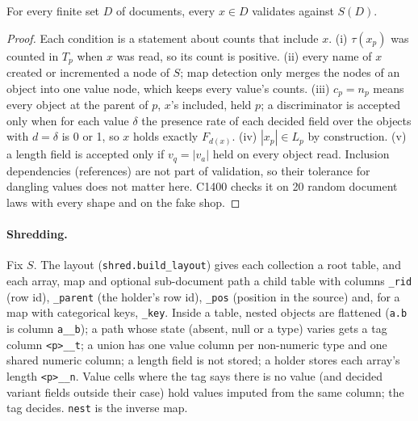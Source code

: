 \begin{proposition}\label{prop:docschema}
For every finite set $D$ of documents, every $x\in D$ validates against $S(D)$.
\end{proposition}
\begin{proof}
Each condition is a statement about counts that include $x$. (i) $\tau(x_p)$ was counted in $T_p$ when $x$ was read,
so its count is positive. (ii) every name of $x$ created or incremented a node of $S$; map detection only merges the
nodes of an object into one value node, which keeps every value's counts. (iii) $c_p=n_p$ means every object at
the parent of $p$, $x$'s included, held $p$; a discriminator is accepted only when for each value $\delta$ the
presence rate of each decided field over the objects with $d=\delta$ is 0 or 1, so $x$ holds exactly $F_{d(x)}$.
(iv) $|x_p|\in L_p$ by construction. (v) a length field is accepted only if $v_q=|v_a|$ held on every object read.
Inclusion dependencies (references) are not part of validation, so their tolerance for dangling values does not
matter here. C1400 checks it on 20 random document laws with every shape and on the fake shop.
\end{proof}

\paragraph{Shredding.} Fix $S$. The layout (\texttt{shred.build\_layout}) gives each collection a root table, and
each array, map and optional sub-document path a child table with columns \texttt{\_rid} (row id),
\texttt{\_parent} (the holder's row id), \texttt{\_pos} (position in the source) and, for a map with categorical
keys, \texttt{\_key}. Inside a table, nested objects are flattened (\texttt{a.b} is column \texttt{a\_\_b}); a path
whose state (absent, null or a type) varies gets a tag column \texttt{<p>\_\_t}; a union has one value column per
non-numeric type and one shared numeric column; a length field is not stored; a holder stores each array's length
\texttt{<p>\_\_n}. Value cells where the tag says there is no value (and decided variant fields outside their case)
hold values imputed from the same column; the tag decides. \texttt{nest} is the inverse map.

